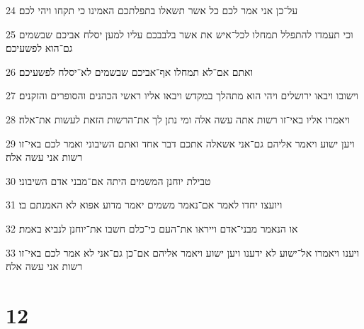 \par 24 על־כן אני אמר לכם כל אשר תשאלו בתפלתכם האמינו כי תקחו ויהי לכם׃
\par 25 וכי תעמדו להתפלל תמחלו לכל־איש את אשר בלבבכם עליו למען יסלח אביכם שבשמים גם־הוא לפשעיכם׃
\par 26 ואתם אם־לא תמחלו אף־אביכם שבשמים לא־יסלח לפשעיכם׃
\par 27 וישובו ויבאו ירושלים ויהי הוא מתהלך במקדש ויבאו אליו ראשי הכהנים והסופרים והזקנים׃
\par 28 ויאמרו אליו באי־זו רשות אתה עשה אלה ומי נתן לך את־הרשות הזאת לעשות את־אלה׃
\par 29 ויען ישוע ויאמר אליהם גם־אני אשאלה אתכם דבר אחד ואתם השיבוני ואמר לכם באי־זו רשות אני עשה אלה׃
\par 30 טבילת יוחנן המשמים היתה אם־מבני אדם השיבוני׃
\par 31 ויועצו יחדו לאמר אם־נאמר משמים יאמר מדוע אפוא לא האמנתם בו׃
\par 32 או הנאמר מבני־אדם וייראו את־העם כי־כלם חשבו את־יוחנן לנביא באמת׃
\par 33 ויענו ויאמרו אל־ישוע לא ידענו ויען ישוע ויאמר אליהם אם־כן גם־אני לא אמר לכם באי־זו רשות אני עשה אלה׃

\chapter{12}

